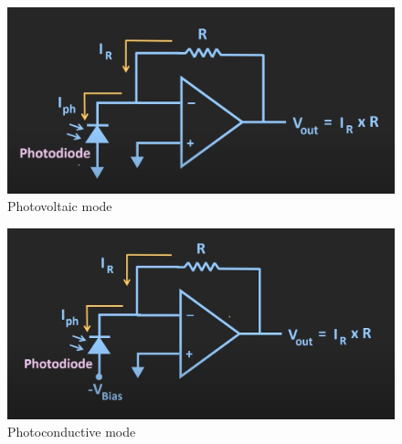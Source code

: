 \documentclass[a4paper,10pt]{IEEEtran}
\begin{document}
\begin{figure}[htbp!]
    \centering
    \includegraphics[width = 0.5\linewidth]{Photovoltaic.jpg}
    \caption{Photovoltaic mode}
    \label{photovoltaic}
    \end{figure} 

\begin{figure}[htbp!]
    \centering
    \includegraphics[width = 0.5\linewidth]{Photoconductive.jpg}
    \caption{Photoconductive mode}
    \label{photoconductive}
\end{figure} 
\vspace{-0.5cm}
\end{document}
